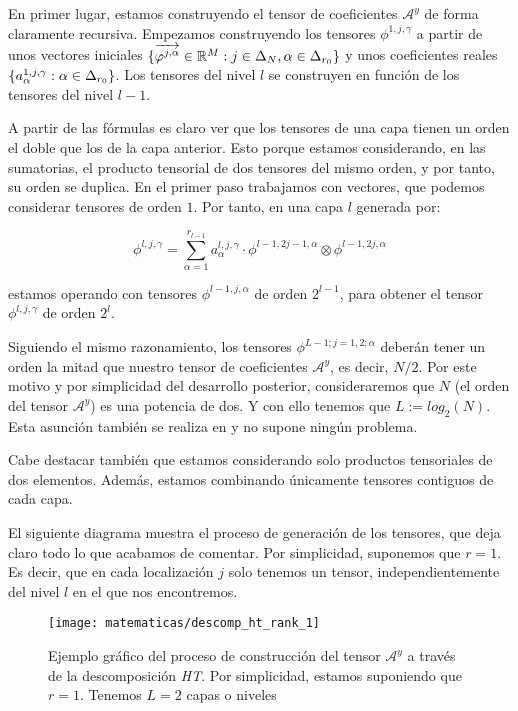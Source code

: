 En primer lugar, estamos construyendo el tensor de coeficientes $\mathcal{A}^y$ de forma claramente recursiva. Empezamos construyendo los tensores $\phi^{1, j, \gamma}$ a partir de unos vectores iniciales $\{\overrightarrow{\varphi^{j, \alpha}} \in \mathbb{R}^M: j \in \Delta_{N}, \alpha \in \Delta_{r_0}  \}$  y unos coeficientes reales $\{a_{\alpha}^{1, j, \gamma}: \alpha \in \Delta_{r_0}\}$. Los tensores del nivel $l$ se construyen en función de los tensores del nivel $l-1$.

A partir de las fórmulas es claro ver que los tensores de una capa tienen un orden el doble que los de la capa anterior. Esto porque estamos considerando, en las sumatorias, el producto tensorial de dos tensores del mismo orden, y por tanto, su orden se duplica. En el primer paso trabajamos con vectores, que podemos considerar tensores de orden $1$. Por tanto, en una capa $l$ generada por:

\begin{equation}
    \phi^{l, j, \gamma} = \sum_{\alpha = 1}^{r_{l-1}} a_{\alpha}^{l, j, \gamma} \cdot \phi^{l-1, 2j-1, \alpha} \otimes \phi^{l-1, 2j, \alpha}
\end{equation}

estamos operando con tensores $\phi^{l-1, j, \alpha}$ de orden $2^{l-1}$, para obtener el tensor $\phi^{l, j, \gamma}$ de orden $2^l$.

Siguiendo el mismo razonamiento, los tensores $\phi^{L-1; j = 1, 2; \alpha}$ deberán tener un orden la mitad que nuestro tensor de coeficientes $\mathcal{A}^y$, es decir, $N / 2$. Por este motivo y por simplicidad del desarrollo posterior, consideraremos que $N$ (el orden del tensor $\mathcal{A}^y$) es una potencia de dos. Y con ello tenemos que $L := log_2(N)$. Esta asunción también se realiza en \cite{matematicas:descomposicion_ht} y no supone ningún problema.

Cabe destacar también que estamos considerando solo productos tensoriales de dos elementos. Además, estamos combinando únicamente tensores contiguos de cada capa.

El siguiente diagrama muestra el proceso de generación de los tensores, que deja claro todo lo que acabamos de comentar. Por simplicidad, suponemos que $r = 1$. Es decir, que en cada localización $j$ solo tenemos un tensor, independientemente del nivel $l$ en el que nos encontremos.

\begin{figure}[H]
    \centering
    \texttt{[image: matematicas/descomp\_ht\_rank\_1]}
    \caption{Ejemplo gráfico del proceso de construcción del tensor $\mathcal{A}^y$ a través de la descomposición \textit{HT}. Por simplicidad, estamos suponiendo que $r = 1$. Tenemos $L = 2$ capas o niveles}
    \label{img:diagrama_ht_simple}
\end{figure}


